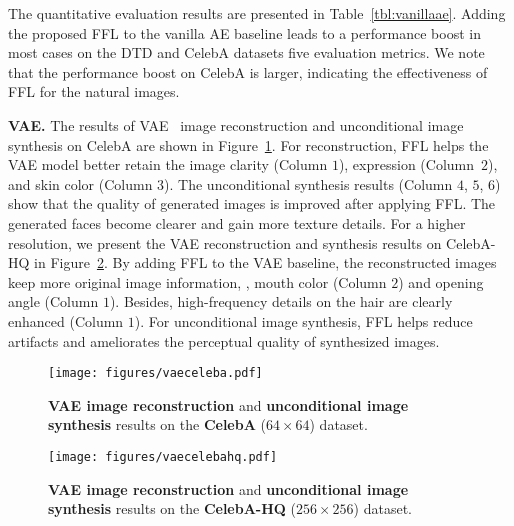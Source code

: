 \documentclass[10pt,twocolumn,letterpaper]{article}
\begin{document}
The quantitative evaluation results are presented in Table~\ref{tbl:vanillaae}.
Adding the proposed FFL to the vanilla AE baseline leads to a performance boost in most cases on the DTD and CelebA datasets \wrt five evaluation metrics.
We note that the performance boost on CelebA is larger, indicating the effectiveness of FFL for the natural images.






\vspace{0.05cm}
\noindent
\textbf{VAE.}
The results of VAE~\cite{vae} image reconstruction and unconditional image synthesis on CelebA are shown in Figure~\ref{fig:vaeceleba}.
For reconstruction, FFL helps the VAE model better retain the image clarity (Column $1$), expression (Column~$2$), and skin color (Column $3$).
The unconditional synthesis results (Column $4$, $5$, $6$) show that the quality of generated images is improved after applying FFL. The generated faces become clearer and gain more texture details.
For a higher resolution, we present the VAE reconstruction and synthesis results on CelebA-HQ in Figure~\ref{fig:vaecelebahq}.
By adding FFL to the VAE baseline, the reconstructed images keep more original image information, \eg, mouth color (Column $2$) and opening angle (Column $1$). Besides, high-frequency details on the hair are clearly enhanced (Column $1$).
For unconditional image synthesis, FFL helps reduce artifacts and ameliorates the perceptual quality of synthesized images.


\begin{figure}[t]
	\centering
	\vspace{-0.2cm}
	\texttt{[image: figures/vaeceleba.pdf]}
\caption{\textbf{VAE image reconstruction} and \textbf{unconditional image synthesis} results on the \textbf{CelebA} ($64 \times 64$) dataset.}
	\label{fig:vaeceleba}
	\vspace{-0.35cm}
\end{figure}





\begin{figure}[t]
	\centering
\texttt{[image: figures/vaecelebahq.pdf]}
	\vspace{-0.05cm}
	\caption{\textbf{VAE image reconstruction} and \textbf{unconditional image synthesis} results on the \textbf{CelebA-HQ} ($256 \times 256$) dataset.}
	\label{fig:vaecelebahq}
	\vspace{-0.12cm}
\end{figure}
\end{document}
